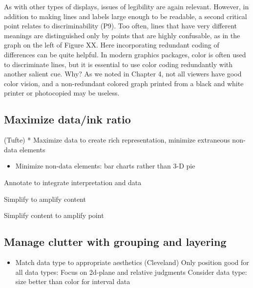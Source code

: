 \documentclass[]{krantz}
\providecommand{\tightlist}{%
  \setlength{\itemsep}{0pt}\setlength{\parskip}{0pt}}
\theoremstyle{definition}
\theoremstyle{definition}
\theoremstyle{definition}
\theoremstyle{remark}
\begin{document}
As with other types of displays, issues of legibility are again
relevant. However, in addition to making lines and labels large enough
to be readable, a second critical point relates to discriminability
(P9). Too often, lines that have very different meanings are
distinguished only by points that are highly confusable, as in the graph
on the left of Figure XX. Here incorporating redundant coding of
differences can be quite helpful. In modern graphics packages, color is
often used to discriminate lines, but it is essential to use color
coding redundantly with another salient cue. Why? As we noted in Chapter
4, not all viewers have good color vision, and a non-redundant colored
graph printed from a black and white printer or photocopied may be
useless.

\subsection{Maximize data/ink ratio}\label{maximize-dataink-ratio}

(Tufte) * Maximize data to create rich representation, minimize
extraneous non-data elements

\begin{itemize}
\tightlist
\item
  Minimize non-data elements: bar charts rather than 3-D pie
\end{itemize}

Annotate to integrate interpretation and data

Simplify to amplify content

Simplify content to amplify point

\subsection{Manage clutter with grouping and
layering}\label{manage-clutter-with-grouping-and-layering}

\begin{itemize}
\tightlist
\item
  Match data type to appropriate aesthetics (Cleveland) Only position
  good for all data types: Focus on 2d-plane and relative judgments
  Consider data type: size better than color for interval data
\end{itemize}
\end{document}
